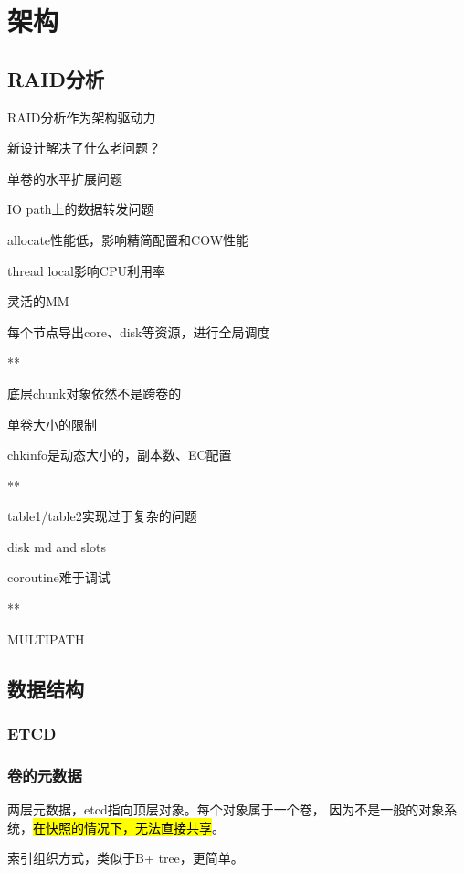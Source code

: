 \chapter{架构}

\section{RAID分析}

RAID分析作为架构驱动力

新设计解决了什么老问题？
\begin{enumbox}
\item 单卷的水平扩展问题
\item IO path上的数据转发问题
\item allocate性能低，影响精简配置和COW性能
\item thread local影响CPU利用率
\item 灵活的MM
\item 每个节点导出core、disk等资源，进行全局调度
\item ***
\item 底层chunk对象依然不是跨卷的
\item 单卷大小的限制
\item chkinfo是动态大小的，副本数、EC配置
\item ***
\item table1/table2实现过于复杂的问题
\item disk md and slots
\item coroutine难于调试
\item ***
\item MULTIPATH
\end{enumbox}

\section{数据结构}

\subsection{ETCD}

\subsection{卷的元数据}

两层元数据，etcd指向顶层对象。每个对象属于一个卷，
因为不是一般的对象系统，\hl{在快照的情况下，无法直接共享}。

索引组织方式，类似于B+ tree，更简单。

